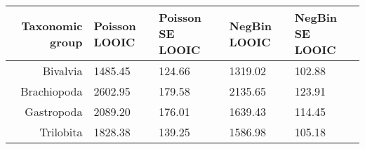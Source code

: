 \begin{table}[ht]
\centering
\begin{tabular}{r|llll}
  \hline
Taxonomic group & Poisson LOOIC & Poisson SE LOOIC & NegBin LOOIC & NegBin SE LOOIC \\ 
  \hline
Bivalvia & 1485.45 & 124.66 & 1319.02 & 102.88 \\ 
  Brachiopoda & 2602.95 & 179.58 & 2135.65 & 123.91 \\ 
  Gastropoda & 2089.20 & 176.01 & 1639.43 & 114.45 \\ 
  Trilobita & 1828.38 & 139.25 & 1586.98 & 105.18 \\ 
   \hline
\end{tabular}
\label{tab:loo}
\end{table}
